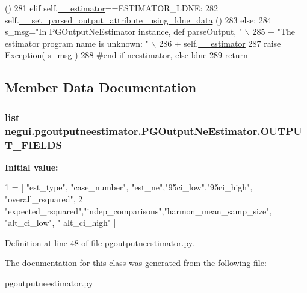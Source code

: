 \begin{DoxyCode}
      ()
281         \textcolor{keywordflow}{elif} self.\hyperlink{classnegui_1_1pgoutputneestimator_1_1PGOutputNeEstimator_a4d34bdc2e4c4fdc788722b016348c6ee}{\_\_estimator}==ESTIMATOR\_LDNE:
282             self.\hyperlink{classnegui_1_1pgoutputneestimator_1_1PGOutputNeEstimator_ab60141608f13bb990250641db8b3817c}{\_\_set\_parsed\_output\_attribute\_using\_ldne\_data}
      ()
283         \textcolor{keywordflow}{else}:
284             s\_msg=\textcolor{stringliteral}{"In PGOutputNeEstimator instance, def parseOutput, "} \(\backslash\)
285                             + \textcolor{stringliteral}{"The estimator program name is unknown: "} \(\backslash\)
286                             + self.\hyperlink{classnegui_1_1pgoutputneestimator_1_1PGOutputNeEstimator_a4d34bdc2e4c4fdc788722b016348c6ee}{\_\_estimator}
287             \textcolor{keywordflow}{raise} Exception( s\_msg )
288         \textcolor{comment}{#end if neestimator, else ldne}
289         \textcolor{keywordflow}{return}
\end{DoxyCode}


\subsection{Member Data Documentation}
\subsubsection[{\texorpdfstring{O\+U\+T\+P\+U\+T\+\_\+\+F\+I\+E\+L\+DS}{OUTPUT_FIELDS}}]{\setlength{\rightskip}{0pt plus 5cm}list negui.\+pgoutputneestimator.\+P\+G\+Output\+Ne\+Estimator.\+O\+U\+T\+P\+U\+T\+\_\+\+F\+I\+E\+L\+DS\hspace{0.3cm}{\ttfamily [static]}}\hypertarget{classnegui_1_1pgoutputneestimator_1_1PGOutputNeEstimator_aa78fb93f7acf4a769ae309f1a3b94302}{}\label{classnegui_1_1pgoutputneestimator_1_1PGOutputNeEstimator_aa78fb93f7acf4a769ae309f1a3b94302}
{\bfseries Initial value\+:}
\begin{DoxyCode}
1 = [ \textcolor{stringliteral}{"est\_type"}, \textcolor{stringliteral}{"case\_number"}, \textcolor{stringliteral}{"est\_ne"},\textcolor{stringliteral}{"95ci\_low"},\textcolor{stringliteral}{"95ci\_high"}, \textcolor{stringliteral}{"overall\_rsquared"},
2                     \textcolor{stringliteral}{"expected\_rsquared"},\textcolor{stringliteral}{"indep\_comparisons"},\textcolor{stringliteral}{"harmon\_mean\_samp\_size"}, \textcolor{stringliteral}{"alt\_ci\_low"}, \textcolor{stringliteral}{"
      alt\_ci\_high"} ]
\end{DoxyCode}


Definition at line 48 of file pgoutputneestimator.\+py.



The documentation for this class was generated from the following file\+:\begin{DoxyCompactItemize}
\item 
pgoutputneestimator.\+py\end{DoxyCompactItemize}
